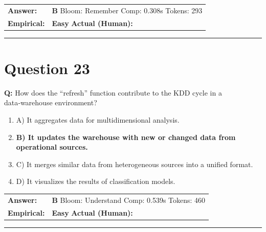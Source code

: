 \documentclass[9pt]{article}
\begin{document}
\begin{tabular}{@{}l p{10.5cm}@{}}
\textbf{Answer:} & \textbf{B} \hspace{1em} Bloom: Remember \hspace{1em} Comp: 0.308s \hspace{1em} Tokens: 293 \\
\textbf{Empirical:} & \textbf{Easy} \hspace{1em} \textbf{Actual (Human):} \underline{\hspace{5cm}}
\end{tabular}

\vspace{0.2cm}
\rule{\textwidth}{0.4pt}
\vspace{0.2cm}


\section*{Question 23}

\textbf{Q:} How does the “refresh” function contribute to the KDD cycle in a data‑warehouse environment?

\begin{enumerate}[label=\textbf{\alph{*})}, nosep]
    \item A) It aggregates data for multidimensional analysis.
    \item \textbf{B) It updates the warehouse with new or changed data from operational sources.} %
    \item C) It merges similar data from heterogeneous sources into a unified format.
    \item D) It visualizes the results of classification models.

\end{enumerate}

\begin{tabular}{@{}l p{10.5cm}@{}}
\textbf{Answer:} & \textbf{B} \hspace{1em} Bloom: Understand \hspace{1em} Comp: 0.539s \hspace{1em} Tokens: 460 \\
\textbf{Empirical:} & \textbf{Easy} \hspace{1em} \textbf{Actual (Human):} \underline{\hspace{5cm}}
\end{tabular}

\vspace{0.2cm}
\rule{\textwidth}{0.4pt}
\vspace{0.2cm}
\end{document}
